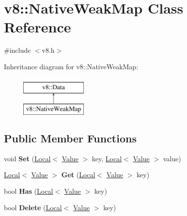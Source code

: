 \hypertarget{classv8_1_1NativeWeakMap}{}\section{v8\+:\+:Native\+Weak\+Map Class Reference}
\label{classv8_1_1NativeWeakMap}


{\ttfamily \#include $<$v8.\+h$>$}

Inheritance diagram for v8\+:\+:Native\+Weak\+Map\+:\begin{figure}[H]
\begin{center}
\leavevmode
\includegraphics[height=2.000000cm]{classv8_1_1NativeWeakMap}
\end{center}
\end{figure}
\subsection*{Public Member Functions}
\begin{DoxyCompactItemize}
\item 
void {\bfseries Set} (\hyperlink{classv8_1_1Local}{Local}$<$ \hyperlink{classv8_1_1Value}{Value} $>$ key, \hyperlink{classv8_1_1Local}{Local}$<$ \hyperlink{classv8_1_1Value}{Value} $>$ value)\hypertarget{classv8_1_1NativeWeakMap_ade0e4ce74820a0fcf8b51fb1cea733a7}{}\label{classv8_1_1NativeWeakMap_ade0e4ce74820a0fcf8b51fb1cea733a7}

\item 
\hyperlink{classv8_1_1Local}{Local}$<$ \hyperlink{classv8_1_1Value}{Value} $>$ {\bfseries Get} (\hyperlink{classv8_1_1Local}{Local}$<$ \hyperlink{classv8_1_1Value}{Value} $>$ key)\hypertarget{classv8_1_1NativeWeakMap_a9350148caa6f09f7c228dda255317387}{}\label{classv8_1_1NativeWeakMap_a9350148caa6f09f7c228dda255317387}

\item 
bool {\bfseries Has} (\hyperlink{classv8_1_1Local}{Local}$<$ \hyperlink{classv8_1_1Value}{Value} $>$ key)\hypertarget{classv8_1_1NativeWeakMap_a9de62c6399280088c86bb57c3988e7cb}{}\label{classv8_1_1NativeWeakMap_a9de62c6399280088c86bb57c3988e7cb}

\item 
bool {\bfseries Delete} (\hyperlink{classv8_1_1Local}{Local}$<$ \hyperlink{classv8_1_1Value}{Value} $>$ key)\hypertarget{classv8_1_1NativeWeakMap_ae3c04eaa9e745732f7b2f16c6e75dead}{}\label{classv8_1_1NativeWeakMap_ae3c04eaa9e745732f7b2f16c6e75dead}

\end{DoxyCompactItemize}
